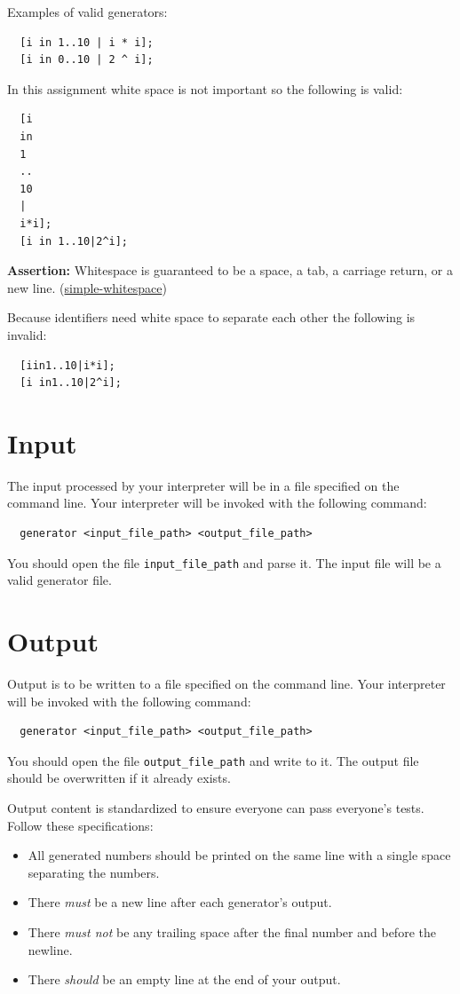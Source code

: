 \documentclass{article}
\newcommand{\code}[1]{\texttt{\textmd{#1}}}
\newcommand{\assertion}[2]{\textbf{Assertion: }#1 (\hyperlink{#2}{#2})}
\begin{document}
Examples of valid generators:
\begin{lstlisting}
  [i in 1..10 | i * i];
  [i in 0..10 | 2 ^ i];
\end{lstlisting}

In this assignment white space is not important so the following is valid:

\begin{lstlisting}
  [i
  in
  1
  ..
  10
  |
  i*i];
  [i in 1..10|2^i];
\end{lstlisting}

\assertion{Whitespace is guaranteed to be a space, a tab, a carriage return, or a new
line.}{simple-whitespace}

Because identifiers need white space to separate each other the following is invalid:
\begin{lstlisting}
  [iin1..10|i*i];
  [i in1..10|2^i];
\end{lstlisting}

\section{Input}
The input processed by your interpreter will be in a file specified on the command line. Your
interpreter will be invoked with the following command:
\begin{lstlisting}
  generator <input_file_path> <output_file_path>
\end{lstlisting}
You should open the file \code{input\_file\_path} and parse it. The input file will be a valid
generator file.

\section{Output}
Output is to be written to a file specified on the command line. Your interpreter
will be invoked with the following command:
\begin{lstlisting}
  generator <input_file_path> <output_file_path>
\end{lstlisting}
You should open the file \code{output\_file\_path} and write to it. The output file should be
overwritten if it already exists.

Output content is standardized to ensure everyone can pass everyone's tests. Follow these
specifications:
\begin{itemize}
  \item
    All generated numbers should be printed on the same line with a single space separating the
    numbers.
  \item
    There \textit{must} be a new line after each generator's output.
  \item
    There \textit{must not} be any trailing space after the final number and before the newline.
  \item
    There \textit{should} be an empty line at the end of your output.
\end{itemize}
\end{document}
